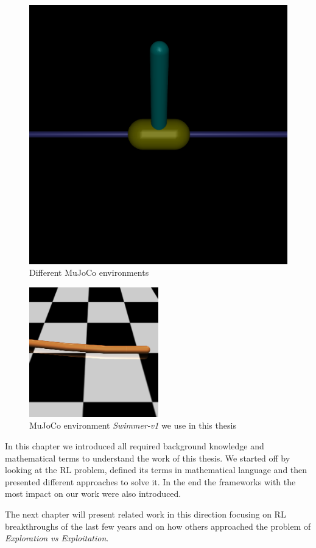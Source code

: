 \begin{figure}[htb]
\endminipage\hfill
{}%
  \includegraphics[width=\linewidth]{images/inv_pendulum.png}
\endminipage
\caption{Different MuJoCo environments}
\label{fig:mujoco_envs}
\end{figure}

\begin{figure}[!htb]
\centerline{
\includegraphics[width=0.5\textwidth]{images/snake.png}}
\caption{MuJoCo environment \emph{Swimmer-v1} we use in this thesis}
\label{fig:swimmer_env}
\end{figure}


In this chapter we introduced all required background knowledge and mathematical terms to understand the work of this thesis.
We started off by looking at the RL problem, defined its terms in mathematical language and then presented different approaches to solve it.
In the end the frameworks with the most impact on our work were also introduced.


The next chapter will present related work in this direction focusing on RL breakthroughs of the last few years and on how others approached the problem of \emph{Exploration vs Exploitation}.
